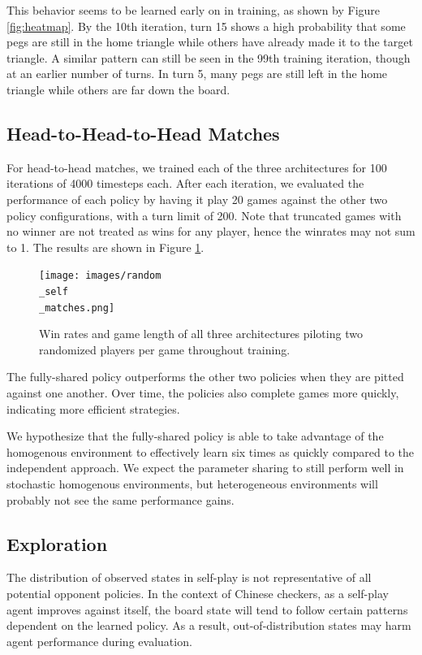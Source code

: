\documentclass[12pt, a4paper, twocolumn]{article}
\begin{document}
This behavior seems to be learned early on in training, as shown by Figure \ref{fig:heatmap}. By the 10th iteration, turn 15 shows a high probability that some pegs are still in the home triangle while others have already made it to the target triangle. A similar pattern can still be seen in the 99th training iteration, though at an earlier number of turns. In turn 5, many pegs are still left in the home triangle while others are far down the board.

\subsection{Head-to-Head-to-Head Matches}

For head-to-head matches, we trained each of the three architectures for 100 iterations of 4000 timesteps each. After each iteration, we evaluated the performance of each policy by having it play 20 games against the other two policy configurations, with a turn limit of 200. Note that truncated games with no winner are not treated as wins for any player, hence the winrates may not sum to 1. The results are shown in Figure \ref{fig:archmatches}.

\begin{figure}[h]
  \centering
    \texttt{[image: images/random\\\_self\\\_matches.png]}
  \caption{Win rates and game length of all three architectures piloting two randomized players per game throughout training.}\label{fig:archmatches}
\end{figure}

The fully-shared policy outperforms the other two policies when they are pitted against one another. Over time, the policies also complete games more quickly, indicating more efficient strategies.

We hypothesize that the fully-shared policy is able to take advantage of the homogenous environment to effectively learn six times as quickly compared to the independent approach. We expect the parameter sharing to still perform well in stochastic homogenous environments, but heterogeneous environments will probably not see the same performance gains.

\subsection{Exploration}

The distribution of observed states in self-play is not representative of all potential opponent policies. In the context of Chinese checkers, as a self-play agent improves against itself, the board state will tend to follow certain patterns dependent on the learned policy. As a result, out-of-distribution states may harm agent performance during evaluation.
\end{document}
